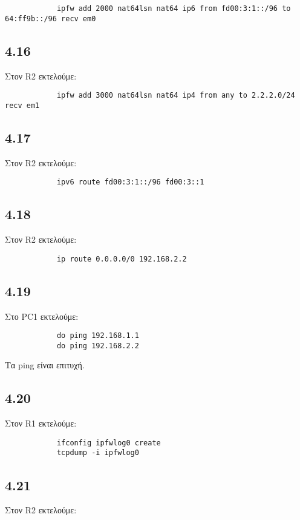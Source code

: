 \documentclass[a4paper, 12pt]{article}
\begin{document}
		\begin{verbatim}
			ipfw add 2000 nat64lsn nat64 ip6 from fd00:3:1::/96 to 64:ff9b::/96 recv em0
		\end{verbatim}

	\subsection*{4.16}
		Στον R2 εκτελούμε:
		
		\begin{verbatim}
			ipfw add 3000 nat64lsn nat64 ip4 from any to 2.2.2.0/24 recv em1
		\end{verbatim}

	\subsection*{4.17}
		Στον R2 εκτελούμε:
		
		\begin{verbatim}
			ipv6 route fd00:3:1::/96 fd00:3::1
		\end{verbatim}

	\subsection*{4.18}
		Στον R2 εκτελούμε:
		
		\begin{verbatim}
			ip route 0.0.0.0/0 192.168.2.2
		\end{verbatim}

	\subsection*{4.19}
		Στο PC1 εκτελούμε:
		
		\begin{verbatim}
			do ping 192.168.1.1
			do ping 192.168.2.2
		\end{verbatim}
		
		Τα ping είναι επιτυχή.

	\subsection*{4.20}
		Στον R1 εκτελούμε:
		
		\begin{verbatim}
			ifconfig ipfwlog0 create
			tcpdump -i ipfwlog0
		\end{verbatim}

	\subsection*{4.21}
		Στον R2 εκτελούμε:
		
\end{document}
